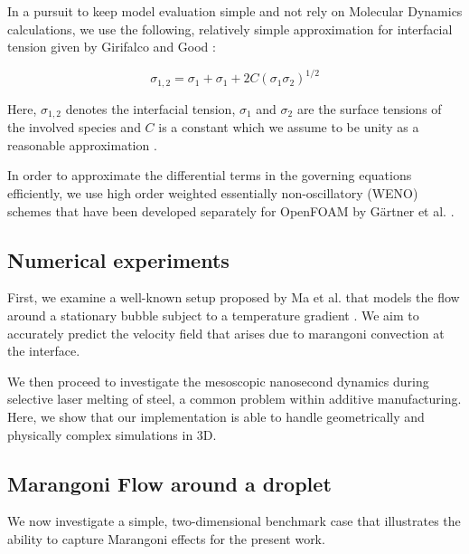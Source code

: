 \documentclass[conference,final]{IEEEtran}
\begin{document}
In a pursuit to keep model evaluation simple and not rely on Molecular Dynamics calculations, we use the following, relatively simple approximation for interfacial tension given by Girifalco and Good \cite{girifalcoTheoryEstimationSurface1957}:

\begin{equation}
    \sigma_{1,2} = \sigma_1 + \sigma_1 + 2C (\sigma_1 \sigma_2)^{1/2}
\end{equation}

Here, $\sigma_{1,2}$ denotes the interfacial tension, $\sigma_1$ and $\sigma_2$ are the surface tensions of the involved species and $C$ is a constant which we assume to be unity as a reasonable approximation \cite{marmurCorrelatingInterfacialTensions2010}.

In order to approximate the differential terms in the governing equations efficiently, we use high order weighted essentially non-oscillatory (WENO) schemes that have been developed separately for OpenFOAM by Gärtner et al. \cite{gartnerEfficientWENOLibrary2020,martinImplementationValidationSemiImplicit2018}.

\subsection{Numerical experiments}

First, we examine a well-known setup proposed by Ma et al. that models the flow around a stationary bubble subject to a temperature gradient \cite{maDirectNumericalSimulation2011}. We aim to accurately predict the velocity field that arises due to marangoni convection at the interface.

We then proceed to investigate the mesoscopic nanosecond dynamics during selective laser melting of steel, a common problem within additive manufacturing. Here, we show that our implementation is able to handle geometrically and physically complex simulations in 3D.


\subsection{Marangoni Flow around a droplet}

We now investigate a simple, two-dimensional benchmark case that illustrates the ability to capture Marangoni effects for the present work.
\end{document}
